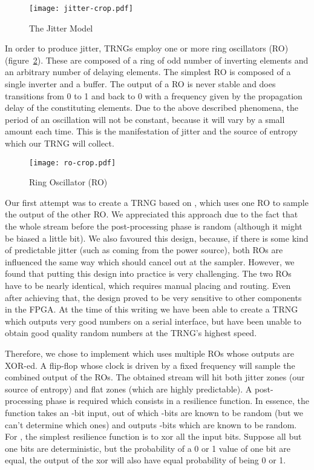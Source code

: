 \documentclass[conference]{IEEEtran}
\begin{document}
\begin{figure}
\centering
\texttt{[image: jitter-crop.pdf]}
\caption{The Jitter Model}
\label{fig:jitter}
\end{figure}

In order to produce jitter, TRNGs employ one or more ring oscillators (RO) (figure~\ref{fig:ro}). These are composed of a ring of odd number of inverting elements and an arbitrary number of delaying elements. The simplest RO is composed of a single inverter and a buffer. The output of a RO is never stable and does transitions from 0 to 1 and back to 0 with a frequency given by the propagation delay of the constituting elements. Due to the above described phenomena, the period of an oscillation will not be constant, because it will vary by a small amount each time. This is the manifestation of jitter and the source of entropy which our TRNG will collect.

\begin{figure}
\centering
\texttt{[image: ro-crop.pdf]}
\caption{Ring Oscillator (RO)}
\label{fig:ro}
\end{figure}

Our first attempt was to create a TRNG based on \cite{Ko04}, which uses one RO to sample the output of the other RO. We appreciated this approach due to the fact that the whole stream before the post-processing phase is random (although it might be biased a little bit). We also favoured this design, because, if there is some kind of predictable jitter (such as coming from the power source), both ROs are influenced the same way which should cancel out at the sampler. However, we found that putting this design into practice is very challenging. The two ROs have to be nearly identical, which requires manual placing and routing. Even after achieving that, the design proved to be very sensitive to other components in the FPGA. At the time of this writing we have been able to create a TRNG which outputs very good numbers on a serial interface, but have been unable to obtain good quality random numbers at the TRNG's highest speed.

Therefore, we chose to implement \cite{Su06} which uses multiple ROs whose outputs are XOR-ed. A flip-flop whose clock is driven by a fixed frequency will sample the combined output of the ROs. The obtained stream will hit both jitter zones (our source of entropy) and flat zones (which are highly predictable). A post-processing phase is required which consists in a resilience function\cite{Resilience}. In essence, the function takes an -bit input, out of which -bits are known to be random (but we can't determine which ones) and outputs -bits which are known to be random. For , the simplest resilience function is to xor all the input bits. Suppose all but one bits are deterministic, but the probability of a 0 or 1 value of one bit are equal, the output of the xor will also have equal probability of being 0 or 1.
\end{document}
